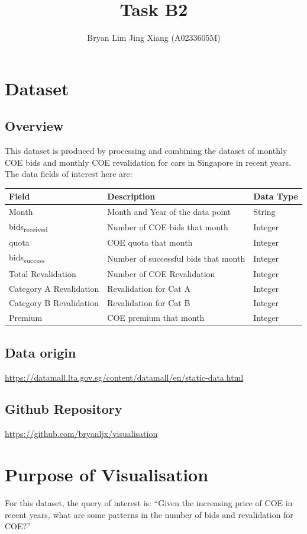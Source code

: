 \documentclass[a4paper, 11pt]{article}
\author{Bryan Lim Jing Xiang (A0233605M)}
\date{}
\title{Task B2}
\begin{document}
\maketitle
\section{Dataset}
\label{sec:orgbc4f2c7}
\subsection{Overview}
\label{sec:orgc89d7f7}
This dataset is produced by processing and combining the dataset of monthly COE bids and monthly COE revalidation for cars in Singapore in recent years. The data fields of interest here are:

\begin{center}
\begin{tabular}{lll}
Field & Description & Data Type\\[0pt]
\hline
Month & Month and Year of the data point & String\\[0pt]
bids\textsubscript{received} & Number of COE bids that month & Integer\\[0pt]
quota & COE quota that month & Integer\\[0pt]
bids\textsubscript{success} & Number of successful bids that month & Integer\\[0pt]
Total Revalidation & Number of COE Revalidation & Integer\\[0pt]
Category A Revalidation & Revalidation for Cat A & Integer\\[0pt]
Category B Revalidation & Revalidation for Cat B & Integer\\[0pt]
Premium & COE premium that month & Integer\\[0pt]
\end{tabular}
\end{center}
\subsection{Data origin}
\label{sec:org04ec085}
\url{https://datamall.lta.gov.sg/content/datamall/en/static-data.html}
\subsection{Github Repository}
\label{sec:org5dfb771}
\url{https://github.com/bryanljx/visualisation}
\section{Purpose of Visualisation}
\label{sec:org5134b12}
For this dataset, the query of interest is: ``Given the increasing price of COE in recent years, what are some patterns in the number of bids and revalidation for COE?''
\end{document}
